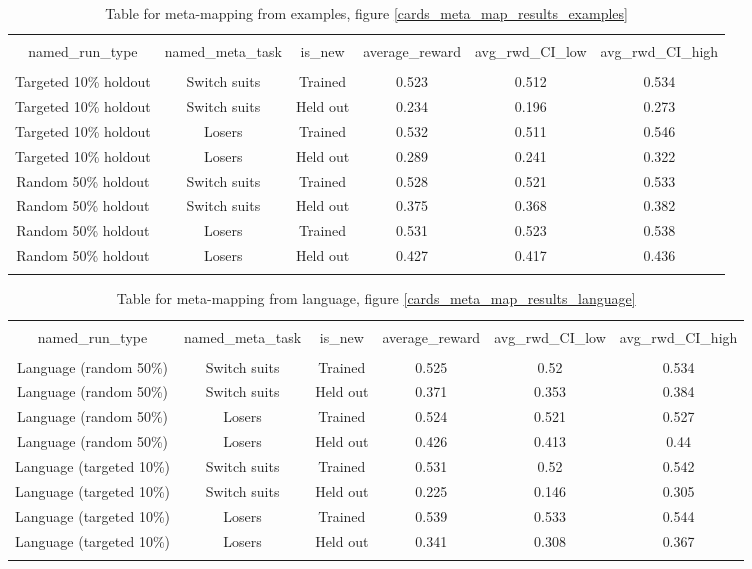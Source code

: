 \documentclass{article}
\begin{document}
\begin{table}[H]
\scriptsize
\centering
\begin{tabular}{@{\extracolsep{5pt}} cccccc}
\\[-1.8ex]\hline
\hline \\[-1.8ex]
named\_run\_type & named\_meta\_task & is\_new & average\_reward & avg\_rwd\_CI\_low & avg\_rwd\_CI\_high \\
\hline \\[-1.8ex]
Targeted 10\% holdout & Switch suits & Trained & 0.523 & 0.512 & 0.534 \\
Targeted 10\% holdout & Switch suits & Held out & 0.234 & 0.196 & 0.273 \\
Targeted 10\% holdout & Losers & Trained & 0.532 & 0.511 & 0.546 \\
Targeted 10\% holdout & Losers & Held out & 0.289 & 0.241 & 0.322 \\
Random 50\% holdout & Switch suits & Trained & 0.528 & 0.521 & 0.533 \\
Random 50\% holdout & Switch suits & Held out & 0.375 & 0.368 & 0.382 \\
Random 50\% holdout & Losers & Trained & 0.531 & 0.523 & 0.538 \\
Random 50\% holdout & Losers & Held out & 0.427 & 0.417 & 0.436 \\
\hline \\[-1.8ex]
\end{tabular}
\caption{Table for meta-mapping from examples, figure \ref{cards_meta_map_results_examples}}
\end{table}

\begin{table}[H]
\scriptsize
\centering
\begin{tabular}{@{\extracolsep{5pt}} cccccc}
\\[-1.8ex]\hline
\hline \\[-1.8ex]
named\_run\_type & named\_meta\_task & is\_new & average\_reward & avg\_rwd\_CI\_low & avg\_rwd\_CI\_high \\
\hline \\[-1.8ex]
Language (random 50\%) & Switch suits & Trained & 0.525 & 0.52 & 0.534 \\
Language (random 50\%) & Switch suits & Held out & 0.371 & 0.353 & 0.384 \\
Language (random 50\%) & Losers & Trained & 0.524 & 0.521 & 0.527 \\
Language (random 50\%) & Losers & Held out & 0.426 & 0.413 & 0.44 \\
Language (targeted 10\%) & Switch suits & Trained & 0.531 & 0.52 & 0.542 \\
Language (targeted 10\%) & Switch suits & Held out & 0.225 & 0.146 & 0.305 \\
Language (targeted 10\%) & Losers & Trained & 0.539 & 0.533 & 0.544 \\
Language (targeted 10\%) & Losers & Held out & 0.341 & 0.308 & 0.367 \\
\hline \\[-1.8ex]
\end{tabular}
\caption{Table for meta-mapping from language, figure \ref{cards_meta_map_results_language}}
\end{table}
\end{document}
